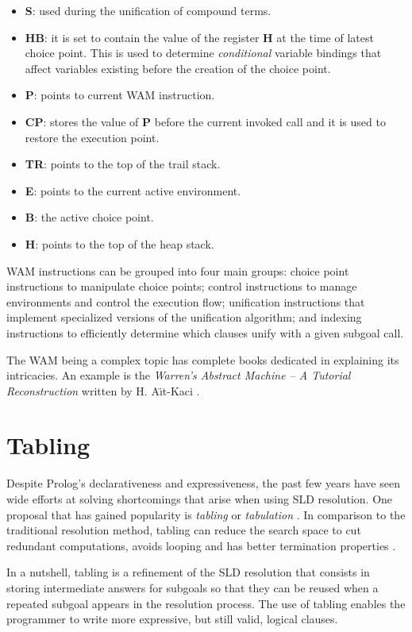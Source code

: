 \begin{itemize}
  \item \textbf{S}: used during the unification of compound terms.
  \item \textbf{HB}: it is set to contain the value of the register \textbf{H} at the time of latest choice point. This is used to
  determine \textit{conditional} variable bindings that affect variables existing before the creation of the choice point.
  \item \textbf{P}: points to current WAM instruction.
  \item \textbf{CP}: stores the value of \textbf{P} before the current invoked call and it is used to restore the execution point.
  \item \textbf{TR}: points to the top of the trail stack.
  \item \textbf{E}: points to the current active environment.
  \item \textbf{B}: the active choice point.
  \item \textbf{H}: points to the top of the heap stack.
\end{itemize}

WAM instructions can be grouped into four main groups: choice point instructions to manipulate choice points; control
instructions to manage environments and control the execution flow; unification instructions that implement
specialized versions of the unification algorithm; and indexing instructions to efficiently determine which clauses
unify with a given subgoal call.

The WAM being a complex topic has complete books dedicated in explaining its intricacies.
An example is the \textit{Warren's Abstract Machine -- A Tutorial Reconstruction} written by H. A\"{\i}t-Kaci \cite{Aitkaci-91}. 

\section{Tabling}

Despite Prolog's declarativeness and expressiveness, the past few years have seen wide efforts at
solving shortcomings that arise when using SLD resolution.
One proposal that has gained popularity is \textit{tabling} or \textit{tabulation} \cite{Chen-96}.
In comparison to the traditional resolution method, tabling can reduce the search space to cut redundant computations,
avoids looping and has better termination properties \cite{Tamaki-86}.

In a nutshell, tabling is a refinement of the SLD resolution that consists in storing intermediate answers for
subgoals so that they can be reused when a repeated subgoal appears in the resolution process.
The use of tabling enables the programmer to write more expressive, but still valid, logical clauses.

